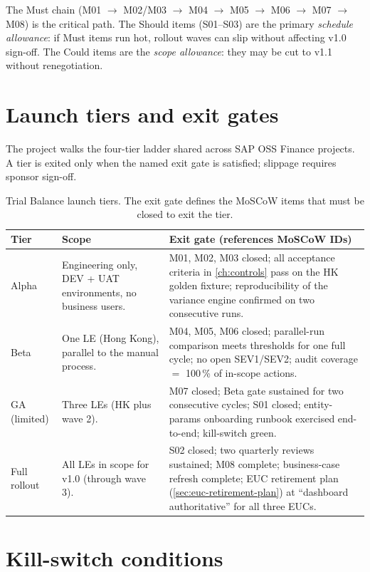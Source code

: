 \documentclass[11pt,a4paper,twoside]{report}
\begin{document}
\noindent
The Must chain (M01 $\to$ M02/M03 $\to$ M04 $\to$ M05 $\to$ M06 $\to$
M07 $\to$ M08) is the critical path. The Should items (S01--S03) are
the primary \emph{schedule allowance}: if Must items run hot, rollout
waves can slip without affecting v1.0 sign-off. The Could items are
the \emph{scope allowance}: they may be cut to v1.1 without renegotiation.

\section{Launch tiers and exit gates}\label{sec:tb-launch-tiers}

The project walks the four-tier ladder shared across SAP OSS Finance
projects. A tier is exited only when the named exit gate is satisfied;
slippage requires sponsor sign-off.

\begin{table}[htbp]
\centering
\caption{Trial Balance launch tiers. The exit gate defines the MoSCoW
items that must be closed to exit the tier.}
\label{tab:tb-launch-tiers}
\footnotesize
\begin{tabularx}{\linewidth}{@{}l l X@{}}
\toprule
\textbf{Tier} & \textbf{Scope} & \textbf{Exit gate (references MoSCoW IDs)} \\ \midrule
Alpha & Engineering only, DEV + UAT environments, no business users. & M01, M02, M03 closed; all acceptance criteria in \cref{ch:controls} pass on the HK golden fixture; reproducibility of the variance engine confirmed on two consecutive runs. \\
Beta  & One LE (Hong Kong), parallel to the manual process. & M04, M05, M06 closed; parallel-run comparison meets thresholds for one full cycle; no open SEV1/SEV2; audit coverage $=$ 100\,\% of in-scope actions. \\
GA (limited) & Three LEs (HK plus wave 2). & M07 closed; Beta gate sustained for two consecutive cycles; S01 closed; entity-params onboarding runbook exercised end-to-end; kill-switch green. \\
Full rollout & All LEs in scope for v1.0 (through wave 3). & S02 closed; two quarterly reviews sustained; M08 complete; business-case refresh complete; EUC retirement plan (\cref{sec:euc-retirement-plan}) at ``dashboard authoritative'' for all three EUCs. \\
\bottomrule
\end{tabularx}
\end{table}

\section{Kill-switch conditions}\label{sec:tb-kill-switch}
\end{document}
